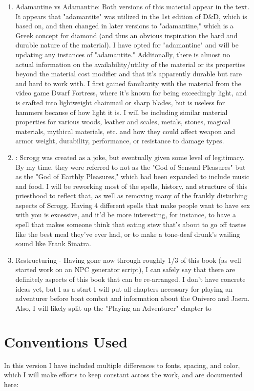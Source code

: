 \begin{enumerate}[leftmargin=12pt]
\item Adamantine vs Adamantite: Both versions of this material appear in the text. It appears that "adamantite" was utilized in the 1st edition of D\&D, which \aq is based on, and then changed in later versions to "adamantine," which is a Greek concept for diamond (and thus an obvious inspiration the hard and durable nature of the material). I have opted for "adamantine" and will be updating any instances of "adamantite." Additonally, there is almost no actual information on the availability/utility of the material or its properties beyond the material cost modifier and that it's apparently durable but rare and hard to work with. I first gained familiarity with the material from the video game Dwarf Fortress, where it's known for being exceedingly light, and is crafted into lightweight chainmail or sharp blades, but is useless for hammers because of how light it is. I will be including similar material properties for various woods, leather and scales, metals, stones, magical materials, mythical materials, etc. and how they could affect weapon and armor weight, durability, performance, or resistance to damage types.
\item {}: Scrogg was created as a joke, but eventually given some level of legitimacy. By my time, they were referred to not as the "God of Sensual Pleasures" but as the "God of Earthly Pleasures," which had been expanded to include music and food. I will be reworking most of the spells, history, and structure of this priesthood to reflect that, as well as removing many of the frankly disturbing aspects of Scrogg. Having 4 different spells that make people want to have sex with you is excessive, and it'd be more interesting, for instance, to have a spell that makes someone think that eating stew that's about to go off tastes like the best meal they've ever had, or to make a tone-deaf drunk's wailing sound like Frank Sinatra. 
\item Restructuring - Having gone now through roughly 1/3 of this book (as well started work on an NPC generator script), I can safely say that there are definitely aspects of this book that can be re-arranged. I don't have concrete ideas yet, but I as a start I will put all chapters necessary for playing an adventurer before boat combat and information about the Onivero and Jaern. Also, I will likely split up the "Playing an Adventurer" chapter to 
\end{enumerate}
\section{Conventions Used}
In this version I have included multiple differences to fonts, spacing, and color, which I will make efforts to keep constant across the work, and are documented here:
